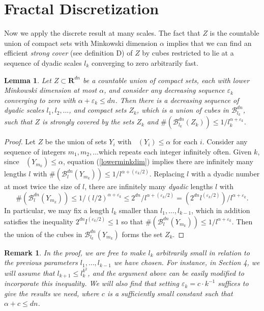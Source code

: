 \documentclass[dvipsnames]{article}
\theoremstyle{plain}
\newtheorem{lemma}{Lemma}
\theoremstyle{plain}
\newtheorem*{remark}{Remark}
\DeclareMathOperator{\lhdim}{\underline{\dim}_{\mathbf{M}}}
\begin{document}
\section{Fractal Discretization}

Now we apply the discrete result at many scales. The fact that $Z$ is the countable union of compact sets with Minkowski dimension $\alpha$ implies that we can find an efficient {\it strong cover} (see definition D) of $Z$ by cubes restricted to lie at a sequence of dyadic scales $l_k$ converging to zero arbitrarily fast.

\begin{lemma}
	Let $Z \subset \mathbf{R}^{dn}$ be a countable union of compact sets, each with lower Minkowski dimension at most $\alpha$, and consider any decreasing sequence $\varepsilon_k$ converging to zero with $\alpha + \varepsilon_k \leq dn$. Then there is a decreasing sequence of dyadic scales $l_1, l_2, \dots$, and compact sets $Z_k$, which is a union of cubes in $\mathcal{B}^{dn}_{l_k}$, such that $Z$ is strongly covered by the sets $Z_k$ and $\#( \mathcal{B}^{dn}_{l_k}(Z_k) ) \leq 1/l_k^{\alpha + \varepsilon_k}$.
\end{lemma}
\begin{proof}
	Let $Z$ be the union of sets $Y_i$ with $\lhdim(Y_i) \leq \alpha$ for each $i$. Consider any sequence of integers $m_1, m_2, \dots$which repeats each integer infinitely often. Given $k$, since $\lhdim(Y_{m_k}) \leq \alpha$, equation (\ref{lowerminkdim}) implies there are infinitely many lengths $l$ with $\#(\mathcal{B}^{dn}_l(Y_{m_k})) \leq 1/l^{\alpha + (\varepsilon_k/2)}$. Replacing $l$ with a dyadic number at most twice the size of $l$, there are infinitely many {\it dyadic} lengths $l$ with
	\[ \# (\mathcal{B}^{dn}_l(Y_{m_k})) \leq 1/(l/2)^{\alpha + \varepsilon_k} \leq 2^{dn}/l^{\alpha + (\varepsilon_k/2)} = (2^{dn} l^{(\varepsilon_k/2)}) / l^{\alpha + \varepsilon_k} . \]
	In particular, we may fix a length $l_k$ smaller than $l_1, \dots, l_{k-1}$, which in addition satisfies the inequality $2^{dn} l^{(\varepsilon_k/2)} \leq 1$ so that $\# ( \mathcal{B}^{dn}_l(Y_{m_k})) \leq 1/l^{\alpha + \varepsilon_k}$. Then the union of the cubes in $\mathcal{B}^{dn}_{l_k}(Y_{m_k})$ forms the set $Z_k$.
\end{proof}

\begin{remark}
	In the proof, we are free to make $l_k$ arbitrarily small in relation to the previous parameters $l_1, \dots, l_{k-1}$ we have chosen. For instance, in Section 4, we will assume that $l_{k+1} \leq l_k^{k^2}$, and the argument above can be easily modified to incorporate this inequality. We will also find that setting $\varepsilon_k = c \cdot k^{-1}$ suffices to give the results we need, where $c$ is a sufficiently small constant such that $\alpha + c \leq dn$.
\end{remark}
\end{document}
